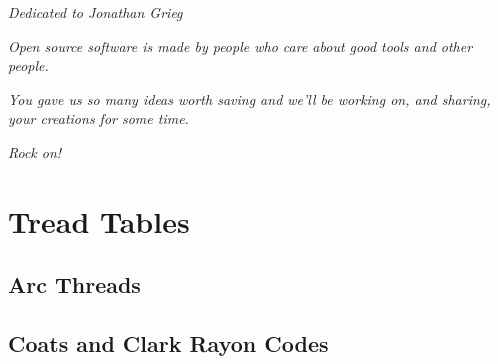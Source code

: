 \newpage

\vspace*{8cm}

\begin{center}
    \emph{Dedicated to Jonathan Grieg}
    
    \vspace{1cm}
    
    \emph{Open source software is made by people who care about good tools
     and other people.}
    
    \vspace{1cm}
    
    \emph{You gave us so many ideas worth saving and we'll be working on,
    and sharing, your creations for some time.}
    
    \vspace{1cm}
    
    \emph{Rock on!}
\end{center}
    
\newpage

\tableofcontents






	



		









\appendix

\chapter{Tread Tables}

\section{Arc Threads}

%

%

\section{Coats and Clark Rayon Codes}

